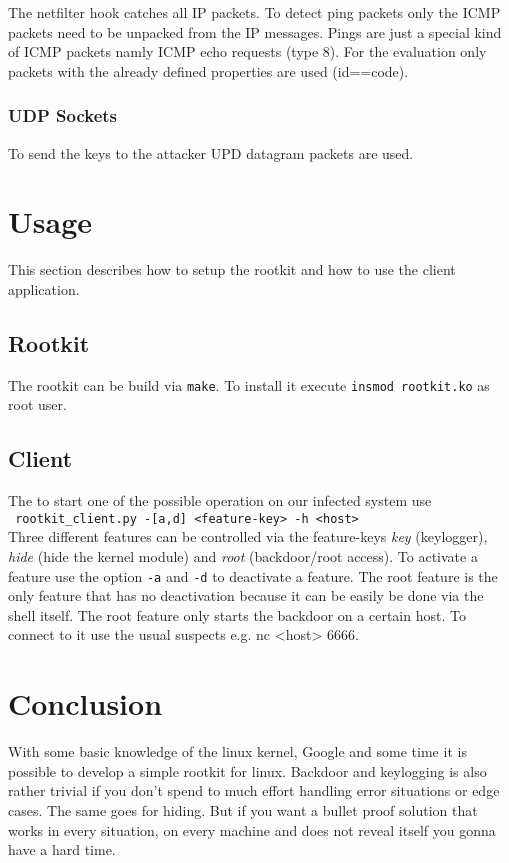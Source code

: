 \documentclass[12pt]{article}
\newcommand{\shellcmd}[1]{\\\indent\indent\texttt{\footnotesize\ #1}\\}
\newcommand{\shellcmdinline}[1]{\texttt{\footnotesize #1}}
\begin{document}
The netfilter hook catches all IP packets. To detect ping packets only the ICMP packets need to be unpacked from the IP messages. Pings are just a special kind of ICMP packets namly ICMP echo requests (type 8).  For the evaluation only packets with the already defined properties are used (id==code).

\subsubsection{UDP Sockets}
To send the keys to the attacker UPD datagram packets are used.

\newpage
\section{Usage}
\label{sec:usage}
This section describes how to setup the rootkit and how to use the client application.

\subsection{Rootkit}
The rootkit can be build via \shellcmdinline{make}. To install it execute \shellcmdinline{insmod rootkit.ko} as root user.

\subsection{Client}
The to start one of the possible operation on our infected system use \shellcmd{rootkit\_client.py~-[a,d]~<feature-key>~-h~<host>} Three different features can be controlled via the feature-keys \emph{key} (keylogger), \emph{hide} (hide the kernel module) and \emph{root} (backdoor/root access). To activate a feature use the option \shellcmdinline{-a} and \shellcmdinline{-d} to deactivate a feature. The root feature is the only feature that has no deactivation because it can be easily be done via the shell itself. The root feature only starts the backdoor on a certain host. To connect to it use the usual suspects e.g. \shellcmdinline\shellcmdinline{nc <host> 6666}.

\newpage
\section{Conclusion}

With some basic knowledge of the linux kernel, Google and some time it is possible to develop a simple rootkit for linux. Backdoor and keylogging is also rather trivial if you don't spend to much effort handling error situations or edge cases. The same goes for hiding. But if you want a bullet proof solution that works in every situation, on every machine and does not reveal itself you gonna have a hard time. 
\end{document}
